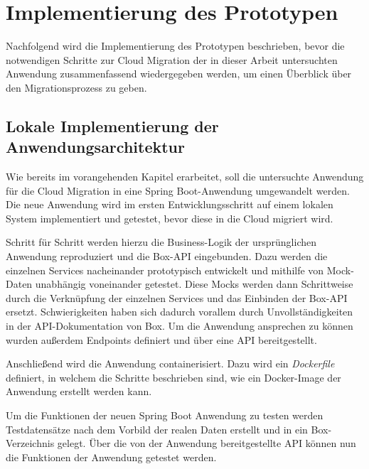 \chapter{Implementierung des Prototypen}

Nachfolgend wird die Implementierung des Prototypen beschrieben, bevor die notwendigen Schritte zur Cloud Migration der in dieser Arbeit untersuchten Anwendung zusammenfassend wiedergegeben werden, um einen Überblick über den Migrationsprozess zu geben.

\section{Lokale Implementierung der Anwendungsarchitektur}

Wie bereits im vorangehenden Kapitel erarbeitet, soll die untersuchte Anwendung für die Cloud Migration in eine \gls{Spring Boot}-Anwendung umgewandelt werden. Die neue Anwendung wird im ersten Entwicklungsschritt auf einem lokalen System implementiert und getestet, bevor diese in die Cloud migriert wird.

Schritt für Schritt werden hierzu die Business-Logik der ursprünglichen Anwendung reproduziert und die \gls{Box}-\ac{API} eingebunden. Dazu werden die einzelnen Services nacheinander prototypisch entwickelt und mithilfe von Mock-Daten unabhängig voneinander getestet. Diese Mocks werden dann Schrittweise durch die Verknüpfung der einzelnen Services und das Einbinden der \gls{Box}-\ac{API} ersetzt. Schwierigkeiten haben sich dadurch vorallem durch Unvollständigkeiten in der \ac{API}-Dokumentation von \gls{Box}. Um die Anwendung ansprechen zu können wurden außerdem Endpoints definiert und über eine \ac{API} bereitgestellt.

Anschließend wird die Anwendung containerisiert. Dazu wird ein \textit{Dockerfile} definiert, in welchem die Schritte beschrieben sind, wie ein Docker-Image der Anwendung erstellt werden kann.

Um die Funktionen der neuen \gls{Spring Boot} Anwendung zu testen werden Testdatensätze nach dem Vorbild der realen Daten erstellt und in ein \gls{Box}-Verzeichnis gelegt. Über die von der Anwendung bereitgestellte \ac{API} können nun die Funktionen der Anwendung getestet werden. \pagebreak

